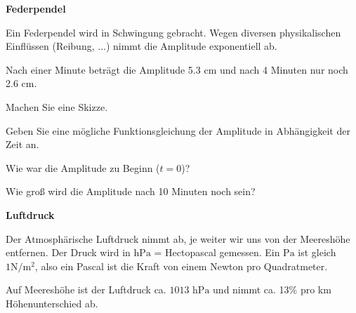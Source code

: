 

\bbwActAufgabenNr{} \textbf{Federpendel}

Ein Federpendel wird in Schwingung gebracht. Wegen diversen
physikalischen Einflüssen (Reibung, ...) nimmt die Amplitude
exponentiell ab.

Nach einer Minute beträgt die Amplitude 5.3 cm und nach 4 Minuten nur noch
2.6 cm.

\begin{bbwAufgabenBlock}

\item Machen Sie eine Skizze.
\item Geben Sie eine mögliche Funktionsgleichung der Amplitude in Abhängigkeit
der Zeit an.
      
\item Wie war die Amplitude zu Beginn ($t=0$)?

\item Wie groß wird die Amplitude nach 10 Minuten noch sein?
\end{bbwAufgabenBlock}
\platzFuerBerechnungenBisEndeSeite{}



\bbwActAufgabenNr{} \textbf{Luftdruck}

Der Atmosphärische Luftdruck nimmt ab, je weiter wir uns von der
Meereshöhe entfernen. Der Druck wird in $\textrm{hPa}$ = Hectopascal
gemessen. Ein $\textrm{Pa}$ ist gleich $1 \textrm{N}/\textrm{m}^2$, also ein
Pascal ist die Kraft von einem Newton pro Quadratmeter.

Auf Meereshöhe ist der Luftdruck ca. $ 1013 \textrm{ hPa}$ und nimmt
ca. 13\% pro km Höhenunterschied ab.


